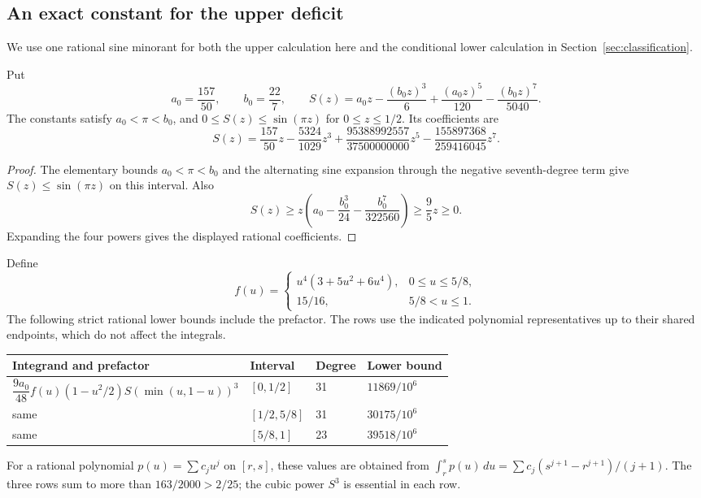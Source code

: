 \subsection{An exact constant for the upper deficit}

We use one rational sine minorant for both the upper calculation here
and the conditional lower calculation in Section~\ref{sec:classification}.

\begin{lemma}\label{lem:sine-minorant}
Put
\[
 a_0=\frac{157}{50},\qquad b_0=\frac{22}{7},\qquad
 S(z)=a_0z-\frac{(b_0z)^3}{6}
          +\frac{(a_0z)^5}{120}-\frac{(b_0z)^7}{5040}.
\]
The constants satisfy $a_0<\pi<b_0$, and
$0\le S(z)\le\sin(\pi z)$ for $0\le z\le1/2$. Its coefficients are
\[
 S(z)=\frac{157}{50}z-\frac{5324}{1029}z^3
       +\frac{95388992557}{37500000000}z^5
       -\frac{155897368}{259416045}z^7.
\]
\end{lemma}
\begin{proof}
The elementary bounds $a_0<\pi<b_0$ and the alternating sine expansion
through the negative seventh-degree term give $S(z)\le\sin(\pi z)$ on
this interval. Also
\[
 S(z)\ge z\left(a_0-\frac{b_0^3}{24}
                       -\frac{b_0^7}{322560}\right)\ge\frac95z\ge0.
\]
Expanding the four powers gives the displayed rational coefficients.
\end{proof}

Define
\[
 f(u)=\begin{cases}
 u^4(3+5u^2+6u^4),&0\le u\le5/8,\\
 15/16,&5/8<u\le1.
 \end{cases}
\]
The following strict rational lower bounds include the prefactor. The
rows use the indicated polynomial representatives up to their shared
endpoints, which do not affect the integrals.
\begin{center}
\begin{tabular}{@{}llll@{}}
\toprule
Integrand and prefactor & Interval & Degree & Lower bound\\
\midrule
$\dfrac{9a_0}{48}f(u)(1-u^2/2)S(\min(u,1-u))^3$
 &$[0,1/2]$&31&$11869/10^6$\\
same &$[1/2,5/8]$&31&$30175/10^6$\\
same &$[5/8,1]$&23&$39518/10^6$\\
\bottomrule
\end{tabular}
\end{center}
For a rational polynomial $p(u)=\sum c_ju^j$ on $[r,s]$, these values
are obtained from
$\int_r^s p(u)\,du=\sum c_j(s^{j+1}-r^{j+1})/(j+1)$.
The three rows sum to more than $163/2000>2/25$; the cubic power $S^3$
is essential in each row.

